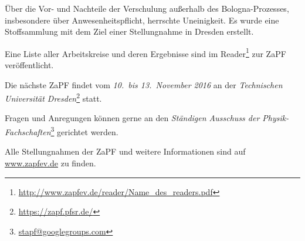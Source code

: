 Über die Vor- und Nachteile der Verschulung außerhalb des Bologna-Prozesses, 
insbesondere über Anwesenheitspflicht, herrschte Uneinigkeit. 
Es wurde eine Stoffsammlung mit dem Ziel einer Stellungnahme in Dresden erstellt.

Eine Liste aller Arbeitskreise und deren Ergebnisse sind im
Reader\footnote{\href{http://www.zapfev.de/reader/Name_des_readers.pdf}{\url{http://www.zapfev.de/reader/Name_des_readers.pdf}}}
zur ZaPF veröffentlicht.

\vfill

Die nächste ZaPF findet vom \emph{10.\ bis 13.\ November 2016} an der  \emph{Technischen Universität Dresden}\footnote{\href{https://zapf.pfsr.de/}{\url{https://zapf.pfsr.de/}}} statt.

Fragen und Anregungen können gerne an den \emph{Ständigen Ausschuss der Physik-Fachschaften}\footnote{\href{mailto:stapf@googlegroups.com}{\url{stapf@googlegroups.com}}} gerichtet werden.

Alle Stellungnahmen der ZaPF und weitere Informationen sind auf \href{http://www.zapfev.de}{\url{www.zapfev.de}} zu finden.

